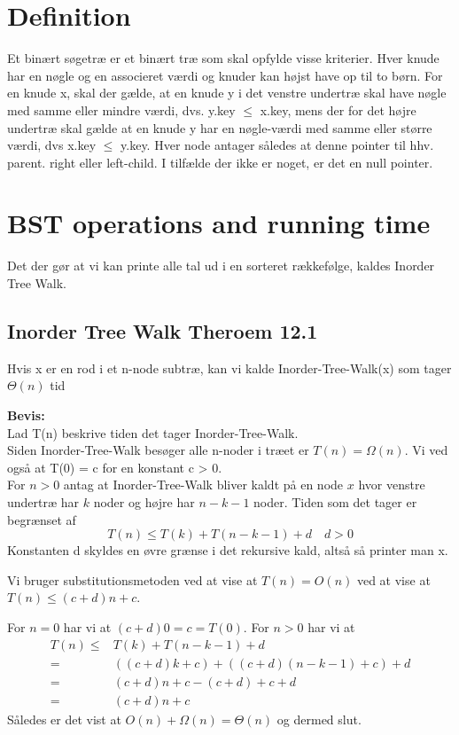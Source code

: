 \documentclass[11pt,a4paper]{report}
\theoremstyle{plain}
\theoremstyle{definition}
\theoremstyle{remark}
\numberwithin{equation}{section}
\begin{document}
\section{Definition}
Et binært søgetræ er et binært træ som skal opfylde visse kriterier.
Hver knude har en nøgle og en associeret værdi og knuder kan højst have op til to børn.
For en knude x, skal der gælde, at en knude y i det venstre undertræ skal have nøgle med samme eller mindre værdi, dvs. y.key $\leq$ x.key, mens der for det højre undertræ skal gælde at en knude y har en nøgle-værdi med samme eller større værdi, dvs x.key $\leq$ y.key.
Hver node antager således at denne pointer til hhv. parent. right eller left-child. I tilfælde der ikke er noget, er det en null pointer.

\section{BST operations and running time}
Det der gør at vi kan printe alle tal ud i en sorteret rækkefølge, kaldes Inorder Tree Walk.
\subsection{Inorder Tree Walk Theroem 12.1}
Hvis x er en rod i et n-node subtræ, kan vi kalde Inorder-Tree-Walk(x) som tager $\Theta(n)$ tid

\textbf{Bevis:}\\
Lad T(n) beskrive tiden det tager Inorder-Tree-Walk. \\
Siden Inorder-Tree-Walk besøger alle n-noder i træet er $T(n) = \Omega(n)$. Vi ved også at T(0) = c for en konstant c > 0.\\
For $n>0$ antag at Inorder-Tree-Walk bliver kaldt på en node $x$ hvor venstre undertræ har $k$ noder og højre har $n-k-1$ noder. Tiden som det tager er begrænset af
\[
T(n) \leq T(k) + T(n-k-1) + d \quad d > 0
\]
Konstanten d skyldes en øvre grænse i det rekursive kald, altså så printer man x.

Vi bruger substitutionsmetoden ved at vise at $T(n)=O(n)$ ved at vise at $T(n) \leq (c + d)n + c$.

For $n = 0$ har vi at $(c + d) 0 = c = T(0)$. For $n > 0$ har vi at
\begin{align*}
  T(n) \leq& T(k) + T(n - k - 1) + d \\
   =& ((c + d) k + c) + ((c + d) (n - k -1) +c ) +d\\
   =& (c + d)n + c - (c + d) + c + d\\
   =& (c + d)n + c
\end{align*}
Således er det vist at $O(n) + \Omega(n) = \Theta(n)$ og dermed slut.
\end{document}
